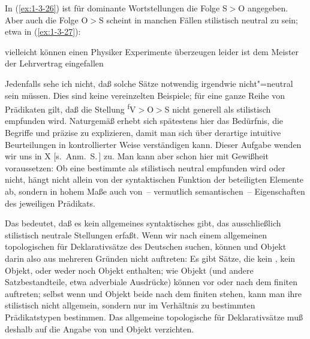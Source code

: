 \documentclass[output=paper]{langsci/langscibook}
\begin{document}
In (\ref{ex:1-3-26}) ist für dominante Wortstellungen die Folge S$>$O angegeben. Aber auch die
Folge O$>$S scheint in manchen Fällen stilistisch neutral zu sein; etwa in (\ref{ex:1-3-27}):
\begin{exe}
\ex\label{ex:1-3-27}
\begin{xlist}
\ex\label{ex:1-3-27a}  vielleicht können einen Physiker Experimente überzeugen
\ex\label{ex:1-3-27b} leider ist dem Meister der Lehrvertrag eingefallen
\end{xlist}
\end{exe}
Jedenfalls sehe ich nicht, daß solche Sätze notwendig irgendwie nicht"=neutral sein
müssen. Dies sind keine vereinzelten Beispiele; für eine ganze Reihe von Prädikaten
gilt, daß die Stellung \textsuperscript{f}V$>$O$>$S nicht generell als stilistisch  empfunden
wird. Naturgemäß erhebt sich spätestens hier das Bedürfnis, die Begriffe  und  präzise zu explizieren, damit man sich über derartige intuitive
Beurteilungen in kontrollierter Weise verständigen kann. Dieser Aufgabe wenden wir uns in X
[s.\ Anm.\ S.\,\pageref{fn-herausgeber-topo}]\label{X:6} zu. Man kann aber schon hier mit Gewißheit
voraussetzen: Ob eine bestimmte  als stilistisch neutral empfunden wird oder nicht,
hängt nicht allein von der syntaktischen Funktion der beteiligten Elemente ab, sondern in hohem Maße
auch von~-- vermutlich semantischen~-- Eigenschaften des jeweiligen Prädikats. 

Das bedeutet, daß es kein allgemeines syntaktisches  gibt, das ausschließlich stilistisch neutrale Stellungen erfaßt. Wenn wir nach einem allgemeinen topologischen  für Deklarativsätze des Deutschen suchen, können  und Objekt darin also aus mehreren Gründen nicht auftreten: Es gibt Sätze, die kein ,
kein Objekt, oder weder  noch Objekt enthalten;  wie Objekt (und andere Satzbestandteile, etwa adverbiale Ausdrücke) können vor oder nach dem finiten  auftreten; selbst wenn  und Objekt beide nach dem finiten  stehen, kann man ihre stilistisch  nicht allgemein, sondern nur im Verhältnis zu bestimmten Prädikatstypen bestimmen. Das allgemeine topologische
 für Deklarativsätze muß deshalb auf die Angabe von  und Objekt
verzichten.
\end{document}
